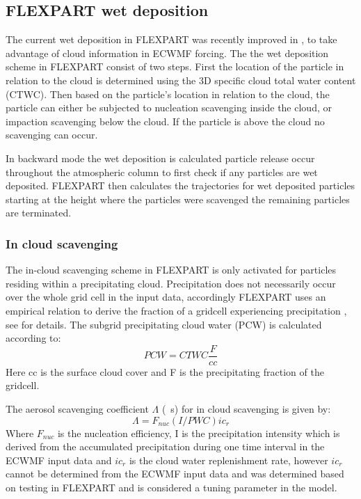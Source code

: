 \subsection{FLEXPART wet deposition}

The current wet deposition in FLEXPART was recently improved in \textcite{flexpart_wetdep}, to take advantage of cloud information in ECWMF forcing. The the wet deposition scheme in FLEXPART consist of two steps. First the location of the particle in relation to the cloud is determined using the 3D specific cloud total
water content (CTWC).  Then based on the particle's location in relation to the cloud, the particle can either be subjected to nucleation scavenging inside the cloud, or impaction scavenging below the cloud. If the particle is above the cloud no scavenging can occur. 

In backward mode the wet deposition is calculated particle release occur throughout the atmospheric column to first check if any particles are wet deposited. FLEXPART then calculates the trajectories for wet deposited particles starting at the height where the particles were scavenged the remaining particles are terminated.    
 
\subsubsection{In cloud scavenging}
The in-cloud scavenging scheme in FLEXPART is only activated for particles residing within a precipitating cloud. Precipitation does not necessarily occur over the whole grid cell in the input data, accordingly FLEXPART uses an empirical relation to derive the fraction of a gridcell experiencing precipitation , see \textcite{Flexpart-2005_ref_paper} for details. The subgrid precipitating cloud water (PCW) is calculated according to: 
\begin{equation}
    PCW = CTWC\frac{F}{cc}
\end{equation}
Here cc is the surface cloud cover and F is the precipitating fraction of the gridcell. 

The aerosol scavenging coefficient $\Lambda$ (\si{\per\s}) for in cloud scavenging is given by:
\begin{equation}
    \Lambda = F_{nuc}\left(I/PWC\right)ic_r
\end{equation}
Where $F_{nuc}$ is the nucleation efficiency, I is the precipitation intensity which is derived from the accumulated precipitation during one time interval in the ECWMF input data and $ic_r$ is the cloud water replenishment rate,  however $ic_r$ cannot be determined from the ECWMF input data and was determined based on testing in FLEXPART and is considered a tuning parameter in the model.   


